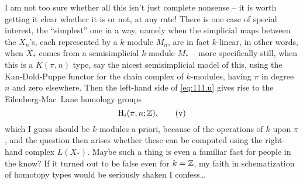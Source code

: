 I am not too sure whether all this isn't just complete
nonsense -- it is worth getting it clear whether it is or not, at any
rate! There is one case of special interest, the ``simplest'' one in a
way, namely when the simplicial maps between the $X_n$'s, each
represented by a $k$-module $M_n$, are in fact $k$-linear, in other
words, when $X_*$ comes from a semisimplicial $k$-module $M_*$ -- more
specifically still, when this is a $K(\pi,n)$ type, say the nicest
semisimplicial model of this, using the Kan-Dold-Puppe functor for the
chain complex of $k$-modules, having $\pi$ in degree $n$ and zero
elsewhere. Then the left-hand side of \eqref{eq:111.u} gives rise to
the Eilenberg-Mac~Lane homology groups
\begin{equation}
  \label{eq:111.v}
  \mathrm H_i(\pi,n;{\mathbb{Z}}),\tag{v}
\end{equation}
which I guess should be $k$-modules a priori, because of the
operations of $k$ upon $\pi$, and the question then arises whether
these can be computed using the right-hand complex $L(X_*)$. Maybe
such a thing is even a familiar fact for people in the know? If it
turned out to be false even for $k={\mathbb{Z}}$, my faith in schematization of
homotopy types would be seriously shaken I confess\dots

\starsbreak

